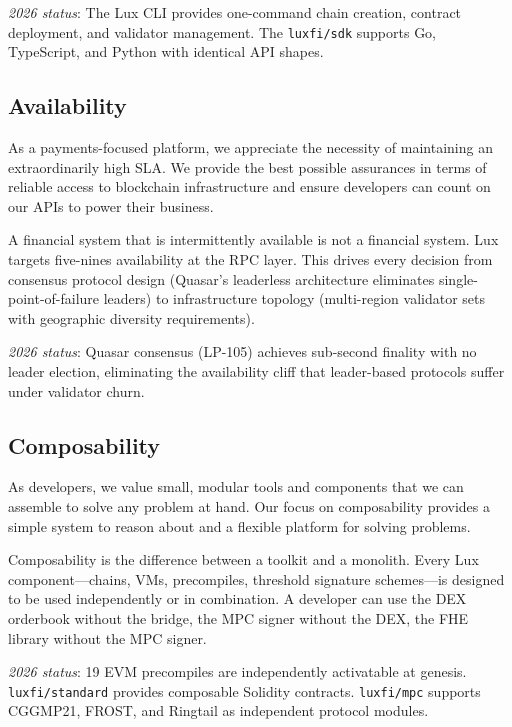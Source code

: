 \documentclass[11pt,a4paper]{article}
\begin{document}
\medskip\noindent\textit{2026 status}: The Lux CLI provides one-command
chain creation, contract deployment, and validator management. The
\texttt{luxfi/sdk} supports Go, TypeScript, and Python with identical
API shapes.

\subsection{Availability}

As a payments-focused platform, we appreciate the necessity of
maintaining an extraordinarily high SLA. We provide the best possible
assurances in terms of reliable access to blockchain infrastructure
and ensure developers can count on our APIs to power their business.

A financial system that is intermittently available is not a financial
system. Lux targets five-nines availability at the RPC layer. This
drives every decision from consensus protocol design (Quasar's
leaderless architecture eliminates single-point-of-failure leaders) to
infrastructure topology (multi-region validator sets with geographic
diversity requirements).

\medskip\noindent\textit{2026 status}: Quasar consensus (LP-105)
achieves sub-second finality with no leader election, eliminating
the availability cliff that leader-based protocols suffer under
validator churn.

\subsection{Composability}

As developers, we value small, modular tools and components that we can
assemble to solve any problem at hand. Our focus on composability
provides a simple system to reason about and a flexible platform for
solving problems.

Composability is the difference between a toolkit and a monolith. Every
Lux component---chains, VMs, precompiles, threshold signature
schemes---is designed to be used independently or in combination. A
developer can use the DEX orderbook without the bridge, the MPC signer
without the DEX, the FHE library without the MPC signer.

\medskip\noindent\textit{2026 status}: 19 EVM precompiles are
independently activatable at genesis. \texttt{luxfi/standard} provides
composable Solidity contracts. \texttt{luxfi/mpc} supports CGGMP21,
FROST, and Ringtail as independent protocol modules.
\end{document}
